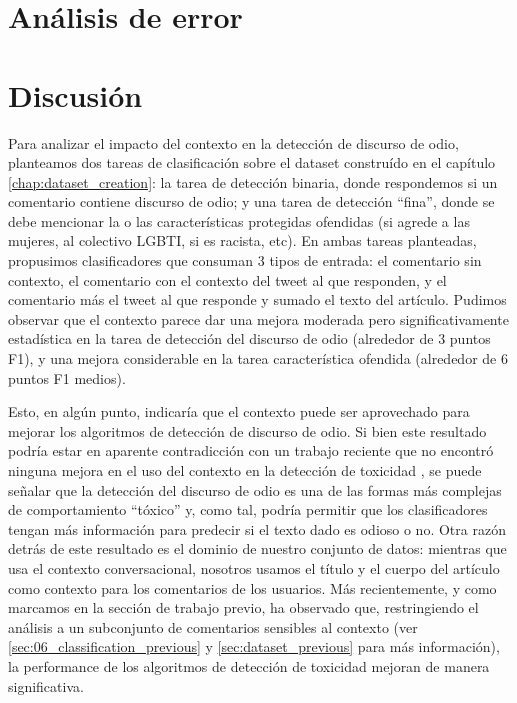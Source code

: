 \section{Análisis de error}

\section{Discusión}

Para analizar el impacto del contexto en la detección de discurso de odio, planteamos dos tareas de clasificación sobre el dataset construído en el capítulo \ref{chap:dataset_creation}: la tarea de detección binaria, donde respondemos si un comentario contiene discurso de odio; y una tarea de detección ``fina'', donde se debe mencionar la o las características protegidas ofendidas (si agrede a las mujeres, al colectivo LGBTI, si es racista, etc). En ambas tareas planteadas, propusimos clasificadores que consuman 3 tipos de entrada: el comentario sin contexto, el comentario con el contexto del tweet al que responden, y el comentario más el tweet al que responde y sumado el texto del artículo. Pudimos observar que el contexto parece dar una mejora moderada pero significativamente estadística en la tarea de detección del discurso de odio (alrededor de 3 puntos F1), y una mejora considerable en la tarea característica ofendida (alrededor de 6 puntos F1 medios).

Esto, en algún punto, indicaría que el contexto puede ser aprovechado para mejorar los algoritmos de detección de discurso de odio. Si bien este resultado podría estar en aparente contradicción con un trabajo reciente que no encontró ninguna mejora en el uso del contexto en la detección de toxicidad \cite{pavlopoulos2020toxicity}, se puede señalar que la detección del discurso de odio es una de las formas más complejas de comportamiento ``tóxico'' y, como tal, podría permitir que los clasificadores tengan más información para predecir si el texto dado es odioso o no. Otra razón detrás de este resultado es el dominio de nuestro conjunto de datos: mientras que \citet{pavlopoulos2020toxicity} usa el contexto conversacional, nosotros usamos el título y el cuerpo del artículo como contexto para los comentarios de los usuarios. Más recientemente, y como marcamos en la sección de trabajo previo, \citet{xenos-2021-context} ha observado que, restringiendo el análisis a un subconjunto de comentarios sensibles al contexto (ver \ref{sec:06_classification_previous} y \ref{sec:dataset_previous} para más información), la performance de los algoritmos de detección de toxicidad mejoran de manera significativa.

